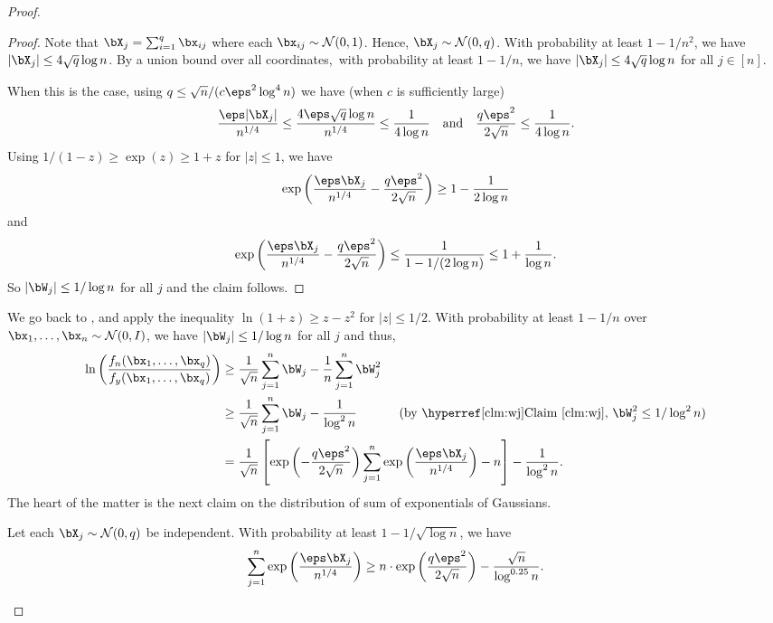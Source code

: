\begin{proof}
\begin{proof} Note that $\bX_j = \sum_{i=1}^q \bx_{ij}$ where each $\bx_{ij} \sim \cN(0,1)$. Hence, $\bX_j \sim \cN(0,q)$.
With probability at least $1-1/n^2$, we have $|\bX_j| \le 4\sqrt{q}\log n$. By a union bound over all coordinates,~with probability at least $1-1/n$, we have $|\bX_j| \le  4\sqrt{q}\log n$ for all $j\in [n]$.

When this is the case, using $ {q\le \sqrt{n}/(c\eps^2 \log^4n)}$
  we have (when $c$ is sufficiently large)
$$\frac{\eps |\bX_j|}{n^{1/4}} \le \frac{4\eps \sqrt{q} \log n }{n^{1/4}} \le \frac{1}{4\log n}\quad\text{and}\quad
\frac{q\eps^2}{2\sqrt{n}} \le \frac{1}{4\log n}.$$ 
Using $1/(1-z) \geq \exp(z) \geq 1+z$ for $|z|\le 1$, we have
$$ \exp\left(\frac{\eps \bX_j}{n^{1/4}} - \frac{q\eps^2}{2\sqrt{n}}\right) \geq 1-\frac{1}{2\log n}$$
and
$$ \exp\left(\frac{\eps \bX_j}{n^{1/4}} - \frac{q\eps^2}{2\sqrt{n}}\right) \leq \frac{ 1}{1-1/(2\log n)} \leq 1 + \frac{1}{\log n}.$$
So $|\bW_j|  \leq 1/\log n$ for all $j$ and the claim follows.
\end{proof}

We go back to , and apply the inequality $\ln(1+z) \geq z-z^2$ for $|z| \leq 1/2$.
With probability at least $1-1/n$ over $\bx_1, \ldots, \bx_n\sim \cN(0,I)$, we have $|\bW_j|\le 1/\log n$ for all $j$ and thus,
\begin{align}
\ln\left(\frac{f_n(\bx_1,  \ldots, \bx_q)}{f_y(\bx_1,  \ldots, \bx_q)} \right)\nonumber
&\geq \frac{1}{\sqrt{n}}\sum_{j=1}^n \bW_j - \frac{1}{n} \sum_{j=1}^n \bW^2_j \\
&\geq \frac{1}{\sqrt{n}}\sum_{j=1}^n \bW_j - \frac{1}{\log^2 n} \ \ \ ~~~~~~~ \textrm{(by \Clm{wj}, $\bW^2_j \leq 1/\log^2 n$)}\nonumber \\
&= \frac{1}{\sqrt{n}} \left[ \exp\left(-\frac{q \eps^2}{2\sqrt{n}}\right) \sum_{j=1}^n \exp\left(\frac{\eps \bX_j}{n^{1/4}}\right) - n \right]  - \frac{1}{\log^2 n}. \label{eq:gaussian}
\end{align}
The heart of the matter is the
next claim on the distribution of sum of exponentials of Gaussians.

\begin{claim} \label{clm:exp-gauss} Let each $\bX_j \sim \cN(0,q)$ be independent.
With probability at least $ 1-1/\sqrt{\log n}$,  we have$$\sum_{j=1}^n \exp\left(\frac{\eps \bX_j}{n^{1/4}}\right) \geq n \cdot\exp\left(\frac{q \eps^2}{2\sqrt{n}}\right) - \frac{\sqrt{n}}{\log^{0.25} n}.$$
\end{claim}


\end{proof}
